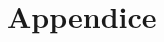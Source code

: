 \documentclass[10pt,oneside,a4paper]{article}
\newenvironment{Figure}
  {\par\medskip\noindent\minipage{\linewidth}}
  {\endminipage\par\medskip}
\begin{document}
\begin{multicols}{2}
\end{multicols}


\newpage
\section{Appendice}





\end{document}
